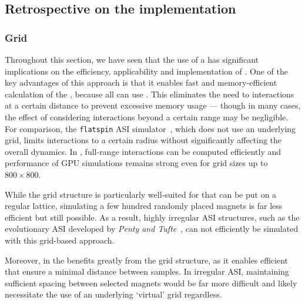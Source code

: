 \subsection{Retrospective on the \hotspice implementation}
\subsubsection{Grid}
Throughout this section, we have seen that the use of a  has significant implications on the efficiency, applicability and implementation of \hotspice.
One of the key advantages of this approach is that it enables fast and memory-efficient calculation of the , because all  can use .
This eliminates the need to  interactions at a certain distance to prevent excessive memory usage --- though in many cases, the effect of considering interactions beyond a certain range may be negligible.
For comparison, the \texttt{flatspin} ASI simulator~\cite{flatspin}, which does not use an underlying grid, limits interactions to a certain radius without significantly affecting the overall dynamics.
In \hotspice, full-range interactions can be computed efficiently and performance of GPU simulations remains strong even for grid sizes up to $800 \times 800$. \par
While the grid structure is particularly well-suited for  that can be put on a regular lattice, simulating a few hundred randomly placed magnets is far less efficient but still possible.
As a result, highly irregular ASI structures, such as the evolutionary ASI developed by \textit{Penty and Tufte}~\cite{ASI_Evolutionary_ALife}, can not efficiently be simulated with this grid-based approach. \par
Moreover,  in the  benefits greatly from the grid structure, as it enables efficient  that ensure a minimal distance between samples.
In irregular ASI, maintaining sufficient spacing between selected magnets would be far more difficult and likely necessitate the use of an underlying `virtual' grid regardless.

